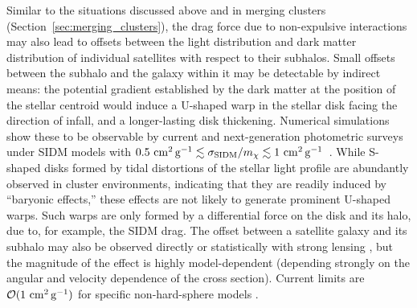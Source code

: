 
Similar to the situations discussed above and in merging clusters (Section~\ref{sec:merging_clusters}), the drag force due to non-expulsive interactions may also lead to offsets between the light distribution and dark matter distribution of individual satellites with respect to their subhalos. Small offsets between the subhalo and the galaxy within it may be detectable by indirect means: the potential gradient established by the dark matter at the position of the stellar centroid would induce a U-shaped warp in the stellar disk facing the direction of infall, and a longer-lasting disk thickening. Numerical simulations show these to be observable by current and next-generation photometric surveys under SIDM models with $0.5 \mathrm{\,\mathrm{\,cm}^2\mathrm{\,g}^{-1}} \lesssim \sigma_{\rm SIDM}/m_\chi \lesssim 1 \mathrm{\,\mathrm{\,cm}^2\mathrm{\,g}^{-1}}$~\citep{Secco}. While S-shaped disks formed by tidal distortions of the stellar light profile are abundantly observed in cluster environments, indicating that they are readily induced by ``baryonic effects,'' these effects are not likely to generate prominent U-shaped warps. Such warps are only formed by a differential force on the disk and its halo, due to, for example, the SIDM drag.  The offset between a satellite galaxy and its subhalo may also be observed directly or statistically with strong lensing \citep{Massey2011,Massey:2017cwf}, but the magnitude of the effect is highly model-dependent (depending strongly on the angular and velocity dependence of the cross section).  Current limits are $\mathcal{O}(1\mathrm{\,\mathrm{\,cm}^2\mathrm{\,g}^{-1}})$ for specific non-hard-sphere models \citep{Harvey:2015hha}.  

\vspace{1em} 
\label{sec:merging_clusters}

